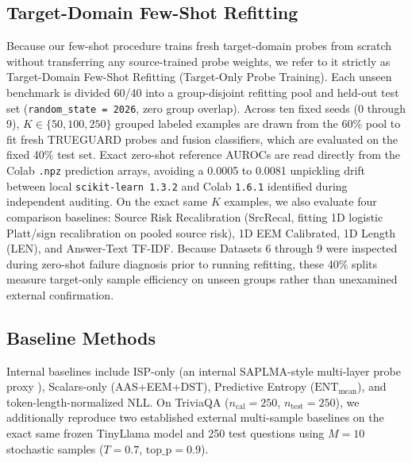 \documentclass{ieeeaccess}
\begin{document}
\subsection{Target-Domain Few-Shot Refitting}
Because our few-shot procedure trains fresh target-domain probes from scratch without transferring any source-trained probe weights, we refer to it strictly as Target-Domain Few-Shot Refitting (Target-Only Probe Training). Each unseen benchmark is divided 60/40 into a group-disjoint refitting pool and held-out test set (\texttt{random\_state = 2026}, zero group overlap). Across ten fixed seeds (0 through 9), $K \in \{50, 100, 250\}$ grouped labeled examples are drawn from the 60\% pool to fit fresh TRUEGUARD probes and fusion classifiers, which are evaluated on the fixed 40\% test set. Exact zero-shot reference AUROCs are read directly from the Colab \texttt{.npz} prediction arrays, avoiding a 0.0005 to 0.0081 unpickling drift between local \texttt{scikit-learn 1.3.2} and Colab \texttt{1.6.1} identified during independent auditing. On the exact same $K$ examples, we also evaluate four comparison baselines: Source Risk Recalibration (SrcRecal, fitting 1D logistic Platt/sign recalibration on pooled source risk), 1D EEM Calibrated, 1D Length (LEN), and Answer-Text TF-IDF. Because Datasets 6 through 9 were inspected during zero-shot failure diagnosis prior to running refitting, these 40\% splits measure target-only sample efficiency on unseen groups rather than unexamined external confirmation.

\subsection{Baseline Methods}
Internal baselines include ISP-only (an internal SAPLMA-style multi-layer probe proxy \cite{review27}), Scalars-only (AAS+EEM+DST), Predictive Entropy ($\text{ENT}_{\text{mean}}$), and token-length-normalized NLL. On TriviaQA ($n_{\text{cal}} = 250$, $n_{\text{test}} = 250$), we additionally reproduce two established external multi-sample baselines on the exact same frozen TinyLlama model and 250 test questions using $M = 10$ stochastic samples ($T = 0.7$, $\text{top\_p} = 0.9$).
\end{document}
